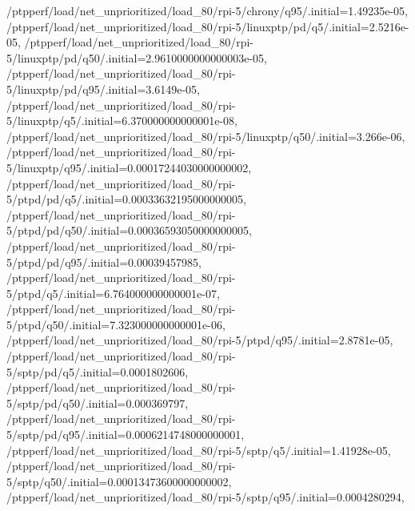 {    /ptpperf/load/net_unprioritized/load_80/rpi-5/chrony/q95/.initial=1.49235e-05,
    /ptpperf/load/net_unprioritized/load_80/rpi-5/linuxptp/pd/q5/.initial=2.5216e-05,
    /ptpperf/load/net_unprioritized/load_80/rpi-5/linuxptp/pd/q50/.initial=2.9610000000000003e-05,
    /ptpperf/load/net_unprioritized/load_80/rpi-5/linuxptp/pd/q95/.initial=3.6149e-05,
    /ptpperf/load/net_unprioritized/load_80/rpi-5/linuxptp/q5/.initial=6.370000000000001e-08,
    /ptpperf/load/net_unprioritized/load_80/rpi-5/linuxptp/q50/.initial=3.266e-06,
    /ptpperf/load/net_unprioritized/load_80/rpi-5/linuxptp/q95/.initial=0.00017244030000000002,
    /ptpperf/load/net_unprioritized/load_80/rpi-5/ptpd/pd/q5/.initial=0.00033632195000000005,
    /ptpperf/load/net_unprioritized/load_80/rpi-5/ptpd/pd/q50/.initial=0.00036593050000000005,
    /ptpperf/load/net_unprioritized/load_80/rpi-5/ptpd/pd/q95/.initial=0.00039457985,
    /ptpperf/load/net_unprioritized/load_80/rpi-5/ptpd/q5/.initial=6.764000000000001e-07,
    /ptpperf/load/net_unprioritized/load_80/rpi-5/ptpd/q50/.initial=7.323000000000001e-06,
    /ptpperf/load/net_unprioritized/load_80/rpi-5/ptpd/q95/.initial=2.8781e-05,
    /ptpperf/load/net_unprioritized/load_80/rpi-5/sptp/pd/q5/.initial=0.0001802606,
    /ptpperf/load/net_unprioritized/load_80/rpi-5/sptp/pd/q50/.initial=0.000369797,
    /ptpperf/load/net_unprioritized/load_80/rpi-5/sptp/pd/q95/.initial=0.0006214748000000001,
    /ptpperf/load/net_unprioritized/load_80/rpi-5/sptp/q5/.initial=1.41928e-05,
    /ptpperf/load/net_unprioritized/load_80/rpi-5/sptp/q50/.initial=0.00013473600000000002,
    /ptpperf/load/net_unprioritized/load_80/rpi-5/sptp/q95/.initial=0.0004280294,}